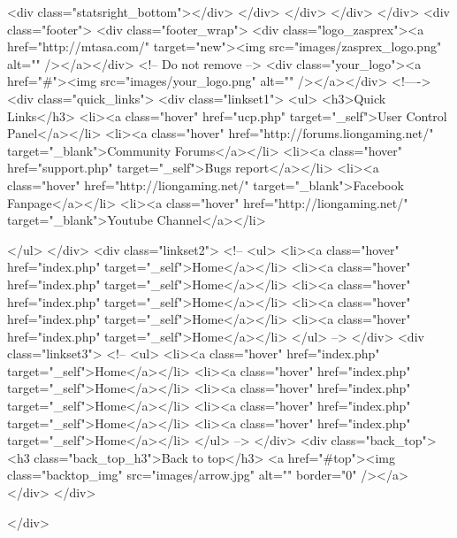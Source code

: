 <div class="statsright_bottom"></div>
</div>
</div>
</div>
</div>
<div class="footer">
    <div class="footer_wrap">
        <div class="logo_zasprex"><a href="http://mtasa.com/" target="new"><img src="images/zasprex_logo.png" alt="" /></a></div> <!-- Do not remove -->
        <div class="your_logo"><a href="#"><img src="images/your_logo.png" alt="" /></a></div>
        <!---->
        <div class="quick_links">
            <div class="linkset1">
                <ul>
                    <h3>Quick Links</h3>
                    <li><a class="hover" href="ucp.php" target="_self">User Control Panel</a></li>
                    <li><a class="hover" href="http://forums.liongaming.net/" target="_blank">Community Forums</a></li>
                    <li><a class="hover" href="support.php" target="_self">Bugs report</a></li>
                    <li><a class="hover" href="http://liongaming.net/" target="_blank">Facebook Fanpage</a></li>
                    <li><a class="hover" href="http://liongaming.net/" target="_blank">Youtube Channel</a></li>

                </ul>
            </div>
            <div class="linkset2">
                <!--
                <ul>
                    <li><a class="hover" href="index.php" target="_self">Home</a></li>
                    <li><a class="hover" href="index.php" target="_self">Home</a></li>
                    <li><a class="hover" href="index.php" target="_self">Home</a></li>
                    <li><a class="hover" href="index.php" target="_self">Home</a></li>
                    <li><a class="hover" href="index.php" target="_self">Home</a></li>
                </ul>
                -->
            </div>
            <div class="linkset3">
                <!--
                <ul>
                    <li><a class="hover" href="index.php" target="_self">Home</a></li>
                    <li><a class="hover" href="index.php" target="_self">Home</a></li>
                    <li><a class="hover" href="index.php" target="_self">Home</a></li>
                    <li><a class="hover" href="index.php" target="_self">Home</a></li>
                    <li><a class="hover" href="index.php" target="_self">Home</a></li>
                </ul>
                -->
            </div>
            <div class="back_top">
                <h3 class="back_top_h3">Back to top</h3>
                <a href="#top"><img class="backtop_img" src="images/arrow.jpg" alt="" border="0" /></a>
            </div>
        </div>

    </div>

